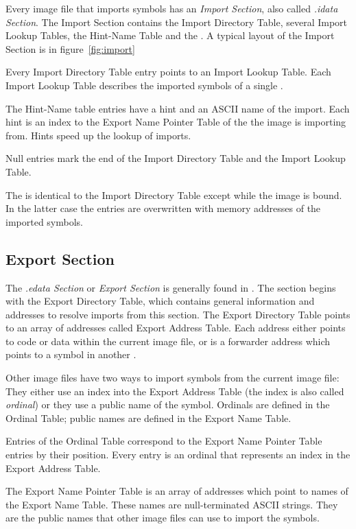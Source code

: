 Every image file that imports symbols has an \emph{Import Section}, also called \emph{.idata Section}.
The Import Section contains the Import Directory Table, several Import Lookup Tables, the Hint-Name Table and the \IAT{}. A typical layout of the Import Section is in figure~\ref{fig:import}

Every Import Directory Table entry points to an Import Lookup Table. Each Import Lookup Table describes the imported symbols of a single \DLL{}.

The Hint-Name table entries have a hint and an ASCII name of the import. Each hint is an index to the Export Name Pointer Table of the \DLL{} the image is importing from. Hints speed up the lookup of imports.

Null entries mark the end of the Import Directory Table and the Import Lookup Table.

The \IAT{} is identical to the Import Directory Table except while the image is bound. In the latter case the \IAT{} entries are overwritten with memory addresses of the imported symbols.

\subsection*{Export Section}

The \emph{.edata Section} or \emph{Export Section} is generally found in . The section begins with the Export Directory Table, which contains general information and addresses to resolve imports from this section. The Export Directory Table points to an array of addresses called Export Address Table. Each address either points to code or data within the current image file, or is a forwarder address which points to a symbol in another \DLL{}. 

Other image files have two ways to import symbols from the current image file: They either use an index into the Export Address Table (the index is also called \emph{ordinal}) or they use a public name of the symbol. Ordinals are defined in the Ordinal Table; public names are defined in the Export Name Table.

Entries of the Ordinal Table correspond to the Export Name Pointer Table entries by their position. Every entry is an ordinal that represents an index in the Export Address Table.

The Export Name Pointer Table is an array of addresses which point to names of the Export Name Table. These names are null-terminated ASCII strings. They are the public names that other image files can use to import the symbols.

